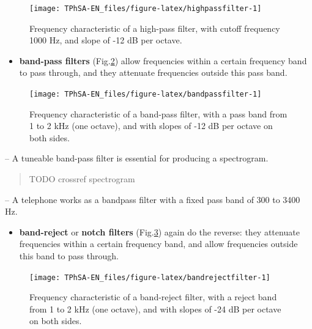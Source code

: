 \documentclass[
]{book}
\providecommand{\tightlist}{%
  \setlength{\itemsep}{0pt}\setlength{\parskip}{0pt}}
\begin{document}
\begin{figure}

{\centering \texttt{[image: TPhSA-EN\_files/figure-latex/highpassfilter-1]} 

}

\caption{Frequency characteristic of a high-pass filter, with cutoff frequency 1000 Hz, and slope of -12 dB per octave.}\label{fig:highpassfilter}
\end{figure}

\begin{itemize}
\tightlist
\item
  \textbf{band-pass filters} (Fig.\ref{fig:bandpassfilter}) allow frequencies within a certain frequency band to pass through, and they attenuate frequencies outside this pass band.
\end{itemize}

\begin{figure}

{\centering \texttt{[image: TPhSA-EN\_files/figure-latex/bandpassfilter-1]} 

}

\caption{Frequency characteristic of a band-pass filter, with a pass band from 1 to 2 kHz (one octave), and with slopes of -12 dB per octave on both sides.}\label{fig:bandpassfilter}
\end{figure}

-- A tuneable band-pass filter is essential for producing a spectrogram.

\begin{quote}
TODO crossref spectrogram
\end{quote}

-- A telephone works as a bandpass filter with a fixed pass band of 300 to 3400 Hz.

\begin{itemize}
\tightlist
\item
  \textbf{band-reject} or \textbf{notch filters} (Fig.\ref{fig:bandrejectfilter}) again do the reverse: they attenuate frequencies within a certain frequency band, and allow frequencies outside this band to pass through.
\end{itemize}

\begin{figure}

{\centering \texttt{[image: TPhSA-EN\_files/figure-latex/bandrejectfilter-1]} 

}

\caption{Frequency characteristic of a band-reject filter, with a reject band from 1 to 2 kHz (one octave), and with slopes of -24 dB per octave on both sides.}\label{fig:bandrejectfilter}
\end{figure}
\end{document}
